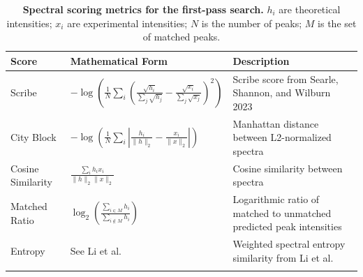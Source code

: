 \documentclass[pdflatex,sn-nature]{sn-jnl}
\begin{document}
{
\renewcommand{\arraystretch}{1.5}
\begin{table}[htbp]
  \centering
  \begin{tabularx}{\textwidth}{@{} l >{\raggedright\arraybackslash}p{} >{\raggedright\arraybackslash}X @{}}
    \toprule
    \textbf{Score} & \textbf{Mathematical Form} & \textbf{Description} \\
    \midrule    
        Scribe & $-\log\left(\frac{1}{N}\sum_i\left(\frac{\sqrt{h_i}}{\sum_j\sqrt{h_j}} - \frac{\sqrt{x_i}}{\sum_j\sqrt{x_j}}\right)^2\right)$ & Scribe score from Searle, Shannon, and Wilburn 2023 \cite{Searle2023-po} \\\addlinespace[5pt]
        City Block & $-\log\left(\frac{1}{N}\sum_i\left|\frac{h_i}{\|h\|_2} - \frac{x_i}{\|x\|_2}\right|\right)$ & Manhattan distance between L2-normalized spectra \\\addlinespace[5pt]
        Cosine Similarity & $\frac{\sum_i h_ix_i}{\|h\|_2\|x\|_2}$ & Cosine similarity between spectra \\\addlinespace[5pt]
        Matched Ratio & $\log_2\left(\frac{\sum_{i\in M} h_i}{\sum_{i\notin M} h_i}\right)$ & Logarithmic ratio of matched to unmatched predicted peak intensities \\\addlinespace[5pt]
        Entropy & See Li et al. \cite{Li2021-wi}  & Weighted spectral entropy similarity from Li et al. \\\addlinespace[5pt]
    \bottomrule
  \end{tabularx}
  \caption{\textbf{Spectral scoring metrics for the first-pass search.} $h_i$ are theoretical intensities; $x_i$ are experimental intensities; $N$ is the number of peaks; $M$ is the set of matched peaks.}
  \label{tab:simple_scores}
\end{table}
}
\end{document}

